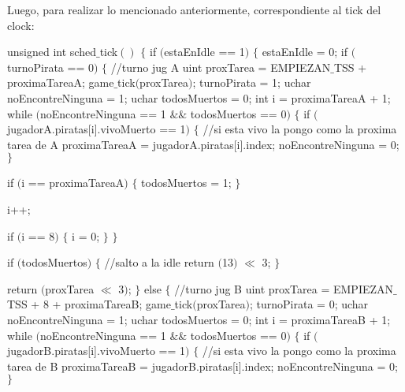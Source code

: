 Luego, para realizar lo mencionado anteriormente, correspondiente al tick del clock:

\begin{algorithmic}
\State \tab unsigned int sched$\_$tick$()$ $\{$
\State \tab \tab  if $($estaEnIdle == 1$)$ $\{$
\State \tab \tab  \tab    estaEnIdle = 0;
\State \tab \tab  \tab    if $($turnoPirata == 0$)$ $\{$
\State \tab \tab  \tab \tab      //turno jug A
\State \tab \tab  \tab \tab      uint proxTarea = EMPIEZAN$\_$TSS + proximaTareaA;
\State \tab \tab  \tab \tab      game$\_$tick$($proxTarea$)$;
\State \tab \tab  \tab \tab      turnoPirata = 1;
\State \tab \tab  \tab \tab      uchar noEncontreNinguna = 1;
\State \tab \tab  \tab \tab      uchar todosMuertos = 0;
\State \tab \tab  \tab \tab      int i = proximaTareaA + 1;
\State \tab \tab  \tab \tab      while $($noEncontreNinguna == 1 $\&\&$ todosMuertos == 0$)$ $\{$
    \State \tab \tab  \tab \tab \tab    if $($jugadorA.piratas[i].vivoMuerto == 1$)$ $\{$
          \State \tab \tab  \tab \tab \tab \tab //si esta vivo la pongo como la proxima tarea de A
          \State \tab \tab  \tab \tab \tab \tab proximaTareaA = jugadorA.piratas[i].index;
          \State \tab \tab  \tab \tab \tab \tab noEncontreNinguna = 0;
    \State \tab \tab  \tab \tab \tab    $\}$

    \State \tab \tab  \tab \tab \tab    if $($i == proximaTareaA$)$ $\{$
          todosMuertos = 1;
    \State \tab \tab  \tab \tab \tab    $\}$

    \State \tab \tab  \tab \tab \tab    i++;

    \State \tab \tab  \tab \tab \tab    if $($i == 8$)$ $\{$
         \State \tab \tab  \tab \tab \tab \tab  i = 0;
    \State \tab \tab  \tab \tab \tab    $\}$
\State \tab \tab  \tab \tab      $\}$

\State \tab \tab  \tab \tab      if $($todosMuertos$)$ $\{$
        //salto a la idle
      \State \tab \tab  \tab \tab \tab  return $($13$)$ $\ll$ 3;
\State \tab \tab  \tab \tab      $\}$

\State \tab \tab  \tab \tab      return $($proxTarea $\ll$ 3$)$;
\State \tab \tab  \tab    $\}$ else $\{$
 \State \tab \tab  \tab \tab     //turno jug B
 \State \tab \tab  \tab \tab     uint proxTarea = EMPIEZAN$\_$TSS + 8 + proximaTareaB;
 \State \tab \tab  \tab \tab     game$\_$tick$($proxTarea$)$;
 \State \tab \tab  \tab \tab     turnoPirata = 0;
 \State \tab \tab  \tab \tab     uchar noEncontreNinguna = 1;
 \State \tab \tab  \tab \tab     uchar todosMuertos = 0;
 \State \tab \tab  \tab \tab     int i = proximaTareaB + 1;
 \State \tab \tab  \tab \tab     while $($noEncontreNinguna == 1 $\&\&$ todosMuertos == 0$)$ $\{$
   \State \tab \tab  \tab \tab \tab     if $($jugadorB.piratas[i].vivoMuerto == 1$)$ $\{$
          //si esta vivo la pongo como la proxima tarea de B
          proximaTareaB = jugadorB.piratas[i].index;
          noEncontreNinguna = 0;
   \State \tab \tab  \tab \tab \tab     $\}$


\end{algorithmic}
